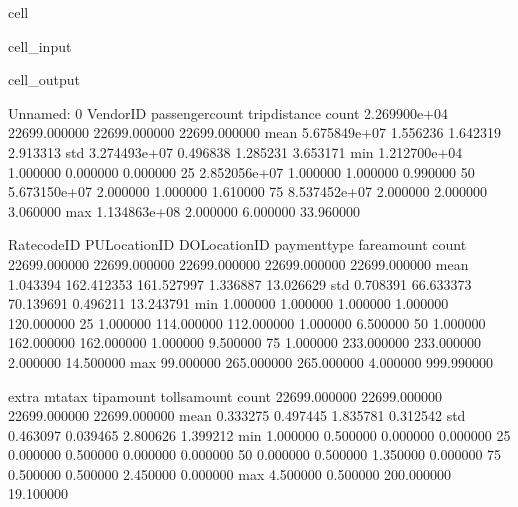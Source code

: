 \documentclass[letterpaper,10pt,english]{sphinxmanual}
\begin{document}
\begin{sphinxuseclass}{cell}
\begin{sphinxuseclass}{cell_input}
\begin{sphinxVerbatim}[commandchars=\\\{\}]
\end{sphinxVerbatim}

\end{sphinxuseclass}
\begin{sphinxuseclass}{cell_output}
\begin{sphinxVerbatim}[commandchars=\\\{\}]
         Unnamed: 0      VendorID  passenger\PYGZus{}count  trip\PYGZus{}distance  \PYGZbs{}
count  2.269900e+04  22699.000000     22699.000000   22699.000000   
mean   5.675849e+07      1.556236         1.642319       2.913313   
std    3.274493e+07      0.496838         1.285231       3.653171   
min    1.212700e+04      1.000000         0.000000       0.000000   
25\PYGZpc{}    2.852056e+07      1.000000         1.000000       0.990000   
50\PYGZpc{}    5.673150e+07      2.000000         1.000000       1.610000   
75\PYGZpc{}    8.537452e+07      2.000000         2.000000       3.060000   
max    1.134863e+08      2.000000         6.000000      33.960000   

         RatecodeID  PULocationID  DOLocationID  payment\PYGZus{}type   fare\PYGZus{}amount  \PYGZbs{}
count  22699.000000  22699.000000  22699.000000  22699.000000  22699.000000   
mean       1.043394    162.412353    161.527997      1.336887     13.026629   
std        0.708391     66.633373     70.139691      0.496211     13.243791   
min        1.000000      1.000000      1.000000      1.000000   \PYGZhy{}120.000000   
25\PYGZpc{}        1.000000    114.000000    112.000000      1.000000      6.500000   
50\PYGZpc{}        1.000000    162.000000    162.000000      1.000000      9.500000   
75\PYGZpc{}        1.000000    233.000000    233.000000      2.000000     14.500000   
max       99.000000    265.000000    265.000000      4.000000    999.990000   

              extra       mta\PYGZus{}tax    tip\PYGZus{}amount  tolls\PYGZus{}amount  \PYGZbs{}
count  22699.000000  22699.000000  22699.000000  22699.000000   
mean       0.333275      0.497445      1.835781      0.312542   
std        0.463097      0.039465      2.800626      1.399212   
min       \PYGZhy{}1.000000     \PYGZhy{}0.500000      0.000000      0.000000   
25\PYGZpc{}        0.000000      0.500000      0.000000      0.000000   
50\PYGZpc{}        0.000000      0.500000      1.350000      0.000000   
75\PYGZpc{}        0.500000      0.500000      2.450000      0.000000   
max        4.500000      0.500000    200.000000     19.100000   


\end{sphinxVerbatim}
\end{sphinxuseclass}
\end{sphinxuseclass}
\end{document}
